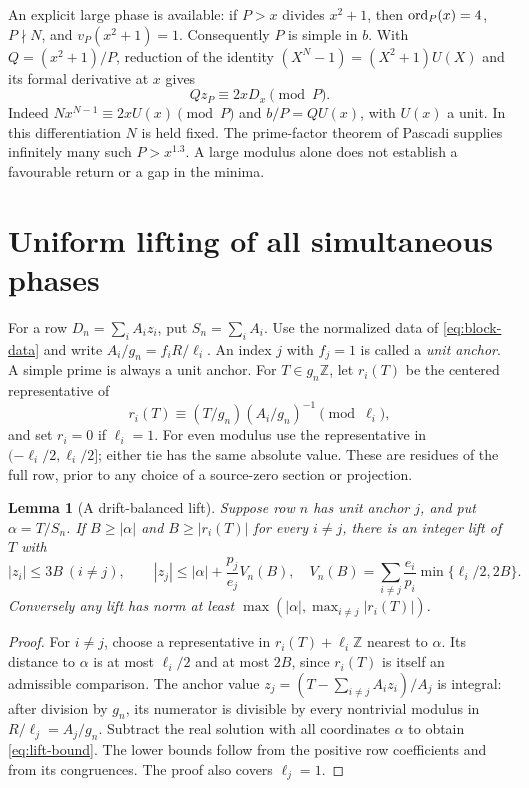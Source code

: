 \documentclass[11pt,a4paper]{article}
\newtheorem{lemma}[theorem]{Lemma}
\theoremstyle{definition}\newtheorem{question}[theorem]{Question}
\theoremstyle{remark}\newtheorem{remark}[theorem]{Remark}
\newcommand{\Z}{\mathbb Z}\newcommand{\R}{\mathbb R}
\begin{document}
An explicit large phase is available: if $P>x$ divides $x^2+1$, then
$\operatorname{ord}_P(x)=4$, $P\nmid N$, and $v_P(x^2+1)=1$.
Consequently $P$ is simple in $b$. With $Q=(x^2+1)/P$, reduction of
the identity $(X^N-1)=(X^2+1)U(X)$ and its formal derivative at $x$
gives
\begin{equation}\label{eq:large-phase}
 Q z_P\equiv 2xD_x\pmod P.
\end{equation}
Indeed $N x^{N-1}\equiv2xU(x)\pmod P$ and $b/P=Q U(x)$,
with $U(x)$ a unit. In this differentiation $N$ is held fixed.
The prime-factor theorem of Pascadi \cite[Theorem 1]{Pascadi}
supplies infinitely many such $P>x^{1.3}$. A large modulus alone
does not establish a favourable return or a gap in the minima.

\section{Uniform lifting of all simultaneous phases}\label{sec:comparison}
For a row $D_n=\sum_i A_i z_i$, put $S_n=\sum_i A_i$.
Use the normalized data of \eqref{eq:block-data} and write
$A_i/g_n=f_iR/\ell_i$. An index $j$ with $f_j=1$ is called a
\emph{unit anchor}. A simple prime is always a unit anchor.
For $T\in g_n\Z$, let $r_i(T)$ be the centered representative of
\begin{equation}\label{eq:global-residue}
 r_i(T)\equiv(T/g_n)(A_i/g_n)^{-1}\pmod{\ell_i},
\end{equation}
and set $r_i=0$ if $\ell_i=1$. For even modulus use the representative
in $(-\ell_i/2,\ell_i/2]$; either tie has the same absolute value.
These are residues of the full row, prior to any choice of a
source-zero section or projection.

\begin{lemma}[A drift-balanced lift]\label{lem:lift}
Suppose row $n$ has unit anchor $j$, and put $\alpha=T/S_n$.
If $B\ge|\alpha|$ and $B\ge|r_i(T)|$ for every $i\ne j$, there is
an integer lift of $T$ with
\begin{equation}\label{eq:lift-bound}
 |z_i|\le3B\ (i\ne j),\qquad
 |z_j|\le|\alpha|+\frac{p_j}{e_j} V_n(B),\quad
 V_n(B)=\sum_{i\ne j}\frac{e_i}{p_i}
                  \min\{\ell_i/2,2B\}.
\end{equation}
Conversely any lift has norm at least
$\max(|\alpha|,\max_{i\ne j}|r_i(T)|)$.
\end{lemma}
\begin{proof}
For $i\ne j$, choose a representative in $r_i(T)+\ell_i\Z$
nearest to $\alpha$. Its distance to $\alpha$ is at most $\ell_i/2$
and at most $2B$, since $r_i(T)$ is itself an admissible comparison.
The anchor value $z_j=(T-\sum_{i\ne j}A_i z_i)/A_j$ is integral:
after division by $g_n$, its numerator is divisible by every
nontrivial modulus in $R/\ell_j=A_j/g_n$. Subtract the real solution
with all coordinates $\alpha$ to obtain \eqref{eq:lift-bound}.
The lower bounds follow from the positive row coefficients and
from its congruences. The proof also covers $\ell_j=1$.
\end{proof}
\end{document}
